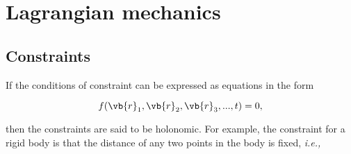 \documentclass[a4paper,12pt]{report}
\begin{document}
\chapter{Lagrangian mechanics}
\section{Constraints}
If the conditions of constraint can be expressed as equations in the form 

\begin{equation}
	f(\vb{r} _{1} , \vb{r} _{2} , \vb{r} _{3} , ..., t) = 0,
\end{equation}

then the constraints are said to be holonomic. For example, the constraint for a rigid body is that the distance of any two points in the body is fixed, \textit{i.e.,} 
\end{document}
